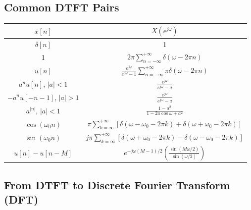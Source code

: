 \subsection{Common DTFT Pairs}
\begin{table}[H]
    \centering
    \begin{tabular}{c c}
    \toprule
    $x[n]$    & $X(e^{j\omega})$ \\ 
    \midrule
        $\delta[n]$     &   1  \\[.5em]
        
        1   &   $2\pi \sum_{n=-\infty}^{+\infty} \delta(\omega-2\pi n)$ \\[.5em]
        
        $u[n]$  &   $\frac{e^{j\omega}}{e^{j\omega}-1} \sum_{n=-\infty}^{+\infty} \pi \delta(\omega-2\pi n)$ \\[.5em]
        
        $a^n u[n]$, $\lvert a \rvert <1$    &   $\frac{e^{j\omega}}{e^{j\omega}-a}$ \\[.5em]

        $-a^n u[-n-1]$, $\lvert a \rvert >1$    &   $\frac{e^{j\omega}}{e^{j\omega}-a}$ \\[.5em]

        $a^{\lvert n \rvert}$, $\lvert a \rvert <1$     &   $\frac{1-a^2}{1-2a\cos\omega+a^2}$ \\[.5em]

        $\cos(\omega_0 n)$    &   $\pi \sum_{k=\infty}^{+\infty} [\delta(\omega -\omega_0 - 2\pi k) + \delta(\omega +\omega_0 - 2\pi k)]$ \\[.5em]

        $\sin(\omega_0 n)$    &   $j\pi \sum_{k=\infty}^{+\infty} [\delta(\omega + \omega_0 - 2\pi k) - \delta(\omega - \omega_0 - 2\pi k)]$ \\[.5em]

        $u[n] - u[n-M]$ &   $e^{-j\omega(M-1)/2} (\frac{\sin(M\omega/2)}{\sin(\omega/2)})$\\[.5em]
    \bottomrule
    \end{tabular}
\end{table}

\subsection{From DTFT to Discrete Fourier Transform (DFT)}

